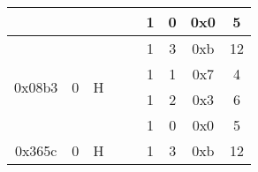 \documentclass[11pt]{homework}
\begin{document}
\begin{arabicparts}
\begin{center}
\begin{tabular}{|c|c|c|c|c|c|c|c|c|}
            \cline{6-9}
                                     &                                                                        &                                                                   &                                                                    &                                                                      & 1                        & 0         & 0x0 & 5             \\
            \hline
            \multirow{4}{*}{0x08b3}  & \multirow{4}{*}{0}                                                     & \multirow{4}{*}{H}                                                & \multirow{4}{*}{}                                                  & \multirow{4}{*}{}                                                    & 1                        & 3         & 0xb & 12            \\
            \cline{6-9}
                                     &                                                                        &                                                                   &                                                                    &                                                                      & 1                        & 1         & 0x7 & 4             \\
            \cline{6-9}
                                     &                                                                        &                                                                   &                                                                    &                                                                      & 1                        & 2         & 0x3 & 6             \\
            \cline{6-9}
                                     &                                                                        &                                                                   &                                                                    &                                                                      & 1                        & 0         & 0x0 & 5             \\
            \hline
            \multirow{4}{*}{0x365c}  & \multirow{4}{*}{0}                                                     & \multirow{4}{*}{H}                                                & \multirow{4}{*}{}                                                  & \multirow{4}{*}{}                                                    & 1                        & 3         & 0xb & 12            \\

\end{tabular}
\end{center}
\end{arabicparts}
\end{document}
